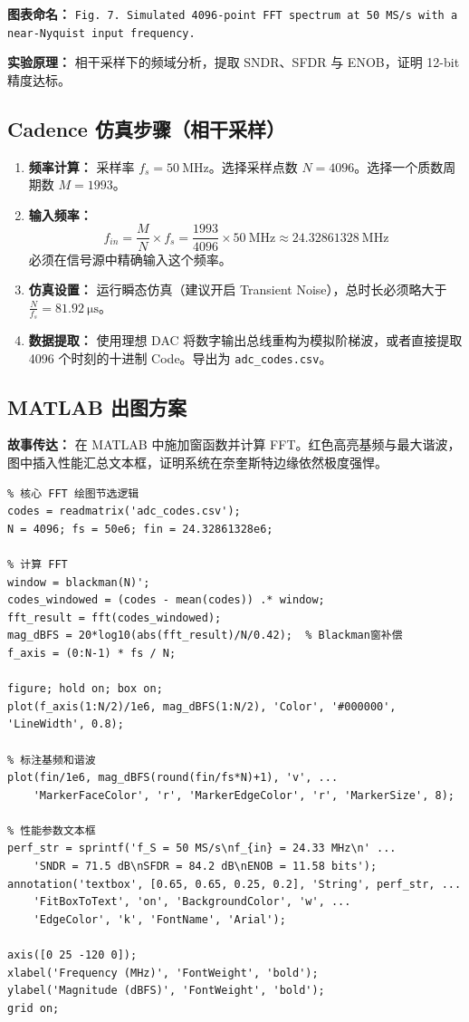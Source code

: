 \documentclass[11pt,a4paper,UTF8]{ctexart}
\begin{document}
\textbf{图表命名：} \texttt{Fig. 7. Simulated 4096-point FFT spectrum at 50 MS/s with a near-Nyquist input frequency.}

\textbf{实验原理：} 相干采样下的频域分析，提取 SNDR、SFDR 与 ENOB，证明 12-bit 精度达标。

\subsection{Cadence 仿真步骤（相干采样）}

\begin{enumerate}[leftmargin=*]
    \item \textbf{频率计算：} 采样率 $f_s = \SI{50}{\mega\hertz}$。选择采样点数 $N = 4096$。选择一个质数周期数 $M = 1993$。
    
    \item \textbf{输入频率：}
    \[
    f_{in} = \frac{M}{N} \times f_s = \frac{1993}{4096} \times \SI{50}{\mega\hertz} \approx \SI{24.32861328}{\mega\hertz}
    \]
    必须在信号源中精确输入这个频率。
    
    \item \textbf{仿真设置：} 运行瞬态仿真（建议开启 Transient Noise），总时长必须略大于 $\frac{N}{f_s} = \SI{81.92}{\micro\second}$。
    
    \item \textbf{数据提取：} 使用理想 DAC 将数字输出总线重构为模拟阶梯波，或者直接提取 4096 个时刻的十进制 Code。导出为 \texttt{adc\_codes.csv}。
\end{enumerate}

\subsection{MATLAB 出图方案}

\textbf{故事传达：} 在 MATLAB 中施加窗函数并计算 FFT。红色高亮基频与最大谐波，图中插入性能汇总文本框，证明系统在奈奎斯特边缘依然极度强悍。

\begin{lstlisting}
% 核心 FFT 绘图节选逻辑
codes = readmatrix('adc_codes.csv');
N = 4096; fs = 50e6; fin = 24.32861328e6;

% 计算 FFT
window = blackman(N)';
codes_windowed = (codes - mean(codes)) .* window;
fft_result = fft(codes_windowed);
mag_dBFS = 20*log10(abs(fft_result)/N/0.42);  % Blackman窗补偿
f_axis = (0:N-1) * fs / N;

figure; hold on; box on;
plot(f_axis(1:N/2)/1e6, mag_dBFS(1:N/2), 'Color', '#000000', 'LineWidth', 0.8);

% 标注基频和谐波
plot(fin/1e6, mag_dBFS(round(fin/fs*N)+1), 'v', ...
    'MarkerFaceColor', 'r', 'MarkerEdgeColor', 'r', 'MarkerSize', 8);

% 性能参数文本框
perf_str = sprintf('f_S = 50 MS/s\nf_{in} = 24.33 MHz\n' ...
    'SNDR = 71.5 dB\nSFDR = 84.2 dB\nENOB = 11.58 bits');
annotation('textbox', [0.65, 0.65, 0.25, 0.2], 'String', perf_str, ...
    'FitBoxToText', 'on', 'BackgroundColor', 'w', ...
    'EdgeColor', 'k', 'FontName', 'Arial');

axis([0 25 -120 0]);
xlabel('Frequency (MHz)', 'FontWeight', 'bold');
ylabel('Magnitude (dBFS)', 'FontWeight', 'bold');
grid on;
\end{lstlisting}
\end{document}
